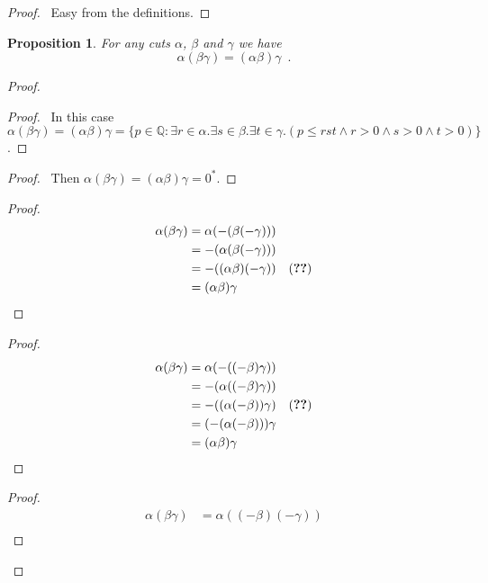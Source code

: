 \documentclass{book}
\let\qed\relax
\newtheorem{prop}{Proposition}[chapter]
\theoremstyle{definition}
\begin{document}
\begin{proof}
\pf\ Easy from the definitions. \qed
\end{proof}

\begin{prop}
For any cuts $\alpha$, $\beta$ and $\gamma$ we have
\[ \alpha (\beta \gamma) = (\alpha \beta) \gamma \enspace . \]
\end{prop}

\begin{proof}
\pf
{}
\begin{proof}
	\pf\ In this case $\alpha (\beta \gamma) = (\alpha \beta) \gamma = \{ p \in \mathbb{Q} : \exists r \in \alpha. \exists s \in \beta. \exists t \in \gamma. (p \leq rst \wedge r > 0 \wedge s > 0 \wedge t > 0) \}$.
\end{proof}
\begin{proof}
	\pf\ Then $\alpha (\beta \gamma) = (\alpha \beta) \gamma = 0^*$.
\end{proof}
\begin{proof}
	\pf
	\begin{align*}
		\alpha (\beta \gamma) & = \alpha (-(\beta (-\gamma))) \\
		& = - (\alpha (\beta (-\gamma))) \\
		& = - ((\alpha \beta) (-\gamma)) & (\text{\stepref{1}}) \\
		& = (\alpha \beta) \gamma
	\end{align*}
\end{proof}
\begin{proof}
	\pf
	\begin{align*}
		\alpha (\beta \gamma) & = \alpha ( -((-\beta)\gamma)) \\
		& = -(\alpha ((-\beta) \gamma)) \\
		& = -((\alpha (-\beta)) \gamma) & (\text{\stepref{1}}) \\
		& = (-(\alpha (-\beta))) \gamma \\
		& = (\alpha \beta) \gamma
	\end{align*}
\end{proof}
\begin{proof}
	\pf
	\begin{align*}
		\alpha (\beta \gamma) & = \alpha ((-\beta)(-\gamma)) \\

\end{align*}
\end{proof}
\end{proof}
\end{document}
